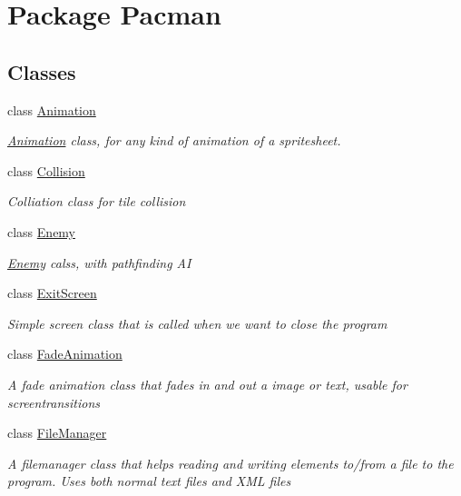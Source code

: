 \hypertarget{namespace_pacman}{\section{Package Pacman}
\label{namespace_pacman}
}
\subsection*{Classes}
\begin{DoxyCompactItemize}
\item 
class \hyperlink{class_pacman_1_1_animation}{Animation}
\begin{DoxyCompactList}\small\item\em \hyperlink{class_pacman_1_1_animation}{Animation} class, for any kind of animation of a spritesheet. \end{DoxyCompactList}\item 
class \hyperlink{class_pacman_1_1_collision}{Collision}
\begin{DoxyCompactList}\small\item\em Colliation class for tile collision \end{DoxyCompactList}\item 
class \hyperlink{class_pacman_1_1_enemy}{Enemy}
\begin{DoxyCompactList}\small\item\em \hyperlink{class_pacman_1_1_enemy}{Enemy} calss, with pathfinding A\-I \end{DoxyCompactList}\item 
class \hyperlink{class_pacman_1_1_exit_screen}{Exit\-Screen}
\begin{DoxyCompactList}\small\item\em Simple screen class that is called when we want to close the program \end{DoxyCompactList}\item 
class \hyperlink{class_pacman_1_1_fade_animation}{Fade\-Animation}
\begin{DoxyCompactList}\small\item\em A fade animation class that fades in and out a image or text, usable for screentransitions \end{DoxyCompactList}\item 
class \hyperlink{class_pacman_1_1_file_manager}{File\-Manager}
\begin{DoxyCompactList}\small\item\em A filemanager class that helps reading and writing elements to/from a file to the program. Uses both normal text files and X\-M\-L files \end{DoxyCompactList}\item 

\end{DoxyCompactItemize}
